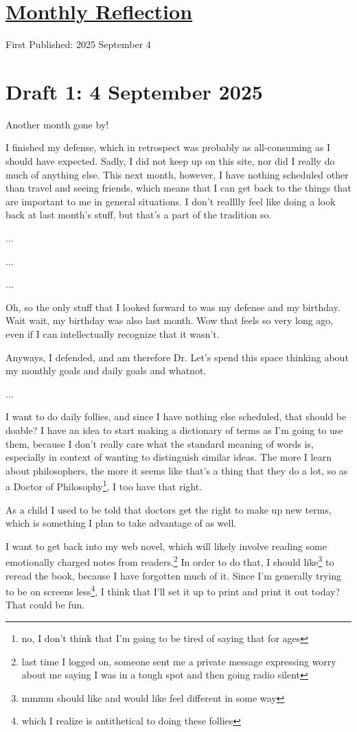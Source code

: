 \documentclass[12pt]{article}
\renewcommand{\,}{\textsuperscript{,}}
\begin{document}
  
\doublespacing  
\section{\href{reflection-august-25.html}{Monthly Reflection}}  
First Published: 2025 September 4

\section{Draft 1: 4 September 2025}

Another month gone by!

I finished my defense, which in retrospect was probably as all-consuming as I should have expected.  
Sadly, I did not keep up on this site, nor did I really do much of anything else.  
This next month, however, I have nothing scheduled other than travel and seeing friends, which means that I can get back to the things that are important to me in general situations.  
I don't realllly feel like doing a look back at last month's stuff, but that's a part of the tradition so.

...

...

...

Oh, so the only stuff that I looked forward to was my defense and my birthday.  
Wait wait, my birthday was also last month.  
Wow that feels so very long ago, even if I can intellectually recognize that it wasn't.

Anyways, I defended, and am therefore Dr.  
Let's spend this space thinking about my monthly goals and daily goals and whatnot.

...

I want to do daily follies, and since I have nothing else scheduled, that should be doable?  
I have an idea to start making a dictionary of terms as I'm going to use them, because I don't really care what the standard meaning of words is, especially in context of wanting to distinguish similar ideas.  
The more I learn about philosophers, the more it seems like that's a thing that they do a lot, so as a Doctor of Philosophy\footnote{no, I don't think that I'm going to be tired of saying that for ages}, I too have that right.

As a child I used to be told that doctors get the right to make up new terms, which is something I plan to take advantage of as well.

I want to get back into my web novel, which will likely involve reading some emotionally charged notes from readers.\footnote{last time I logged on, someone sent me a private message expressing worry about me saying I was in a tough spot and then going radio silent}  
In order to do that, I should like\footnote{mmmm should like and would like feel different in some way} to reread the book, because I have forgotten much of it.  
Since I'm generally trying to be on screens less\footnote{which I realize is antithetical to doing these follies}, I think that I'll set it up to print and print it out today?  
That could be fun.
\end{document}
